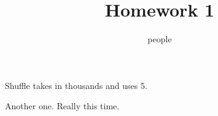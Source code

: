 \documentclass[handout]{ximera}
\title{Homework 1}
\author{people}
\begin{document}
\maketitle



Shuffle takes in thousands and uses 5.



\begin{shuffle}[5]
\end{shuffle}

%
%
%
%
%

Another one.  Really this time.
\end{document}
